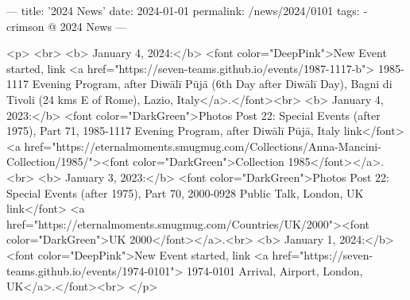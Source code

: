 ---
title: '2024 News'
date: 2024-01-01
permalink: /news/2024/0101
tags:
  - crimson @ 2024 News
---

<p>
<br>
<b> January 4, 2024:</b> <font color="DeepPink">New Event started, link <a href="https://seven-teams.github.io/events/1987-1117-b"> 1985-1117 Evening Program, after Diwālī Pūjā (6th Day after Diwālī Day), Bagni di Tivoli (24 kms E of Rome), Lazio, Italy</a>.</font><br>
<b> January 4, 2023:</b> <font color="DarkGreen">Photos Post 22: Special Events (after 1975), Part 71, 1985-1117 Evening Program, after Diwālī Pūjā, Italy link</font> <a href="https://eternalmoments.smugmug.com/Collections/Anna-Mancini-Collection/1985/"><font color="DarkGreen">Collection 1985</font></a>.<br>
<b> January 3, 2023:</b> <font color="DarkGreen">Photos Post 22: Special Events (after 1975), Part 70, 2000-0928 Public Talk, London, UK link</font> <a href="https://eternalmoments.smugmug.com/Countries/UK/2000"><font color="DarkGreen">UK 2000</font></a>.<br>
<b> January 1, 2024:</b> <font color="DeepPink">New Event started, link <a href="https://seven-teams.github.io/events/1974-0101"> 1974-0101 Arrival, Airport, London, UK</a>.</font><br>
</p>